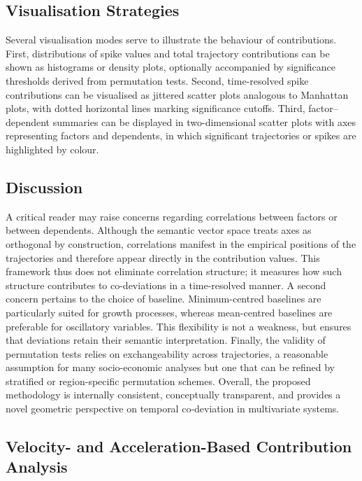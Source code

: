     \subsection{Visualisation Strategies}

        Several visualisation modes serve to illustrate the behaviour of contributions. First, distributions of spike values and total trajectory contributions can be shown as histograms or density plots, optionally accompanied by significance thresholds derived from permutation tests. Second, time-resolved spike contributions can be visualised as jittered scatter plots analogous to Manhattan plots, with dotted horizontal lines marking significance cutoffs. Third, factor--dependent summaries can be displayed in two-dimensional scatter plots with axes representing factors and dependents, in which significant trajectories or spikes are highlighted by colour.

    \subsection{Discussion}

        A critical reader may raise concerns regarding correlations between factors or between dependents. Although the semantic vector space treats axes as orthogonal by construction, correlations manifest in the empirical positions of the trajectories and therefore appear directly in the contribution values. This framework thus does not eliminate correlation structure; it measures how such structure contributes to co-deviations in a time-resolved manner. A second concern pertains to the choice of baseline. Minimum-centred baselines are particularly suited for growth processes, whereas mean-centred baselines are preferable for oscillatory variables. This flexibility is not a weakness, but ensures that deviations retain their semantic interpretation. Finally, the validity of permutation tests relies on exchangeability across trajectories, a reasonable assumption for many socio-economic analyses but one that can be refined by stratified or region-specific permutation schemes. Overall, the proposed methodology is internally consistent, conceptually transparent, and provides a novel geometric perspective on temporal co-deviation in multivariate systems.

    \subsection{Velocity- and Acceleration-Based Contribution Analysis}

